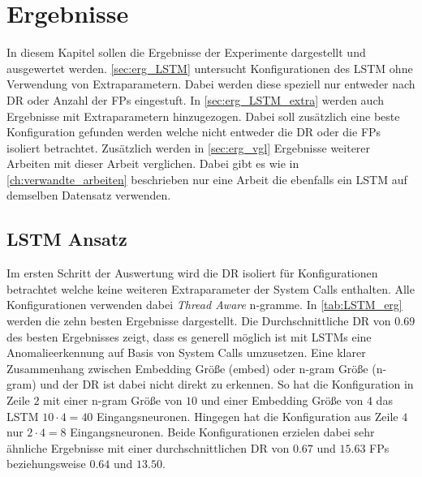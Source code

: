 \chapter{Ergebnisse}\label{ch:erg}

In diesem Kapitel sollen die Ergebnisse der Experimente dargestellt und ausgewertet werden.
\autoref{sec:erg_LSTM} untersucht Konfigurationen des \ac{LSTM} ohne Verwendung von Extraparametern.
Dabei werden diese speziell nur entweder nach \ac{DR} oder Anzahl der \acp{FP} eingestuft.
In \autoref{sec:erg_LSTM_extra} werden auch Ergebnisse mit Extraparametern hinzugezogen.
Dabei soll zusätzlich eine beste Konfiguration gefunden werden welche nicht entweder die \ac{DR} oder die \acp{FP} isoliert betrachtet.
Zusätzlich werden in \autoref{sec:erg_vgl} Ergebnisse weiterer Arbeiten mit dieser Arbeit verglichen.
Dabei gibt es wie in \autoref{ch:verwandte_arbeiten} beschrieben nur eine Arbeit die ebenfalls ein \ac{LSTM} auf demselben Datensatz verwenden.


\section{LSTM Ansatz}\label{sec:erg_LSTM}
    Im ersten Schritt der Auswertung wird die \ac{DR} isoliert für Konfigurationen betrachtet welche keine weiteren Extraparameter der System Calls enthalten.
    Alle Konfigurationen verwenden dabei \textit{Thread Aware} n-gramme.
    In \autoref{tab:LSTM_erg} werden die zehn besten Ergebnisse dargestellt.
    Die Durchschnittliche \ac{DR} von $0.69$ des besten Ergebnisses zeigt, dass es generell möglich ist mit \acp{LSTM} eine Anomalieerkennung auf Basis von System Calls umzusetzen.
    Eine klarer Zusammenhang zwischen Embedding Größe (embed) oder n-gram Größe (n-gram) und der \ac{DR} ist dabei nicht direkt zu erkennen.
    So hat die Konfiguration in Zeile $2$ mit einer n-gram Größe von $10$ und einer Embedding Größe von $4$ das \ac{LSTM} $10 \cdot 4=40$ Eingangsneuronen.
    Hingegen hat die Konfiguration aus Zeile $4$ nur $2 \cdot 4 = 8$ Eingangsneuronen.
    Beide Konfigurationen erzielen dabei sehr ähnliche Ergebnisse mit einer durchschnittlichen \ac{DR} von $0.67$ und $15.63$ \acp{FP} beziehungsweise $0.64$ und $13.50$.


